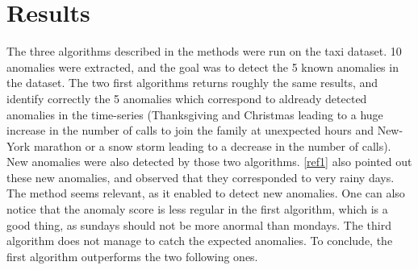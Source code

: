 \documentclass[11pt]{article}
\begin{document}

\section{Results}
The three algorithms described in the methods were run on the taxi dataset. 
10 anomalies were extracted, and the goal was to detect the 5 known anomalies in the dataset. 
The two first algorithms returns roughly the same results, and identify correctly the 5 anomalies which correspond to aldready detected anomalies in the time-series (Thanksgiving and Christmas leading to a huge increase in the number of calls to join the family at unexpected hours and New-York marathon or a snow storm leading to a decrease in the number of calls). 
New anomalies were also detected by those two algorithms.
\ref{ref1} also pointed out these new anomalies, and observed that they corresponded to very rainy days. 
The method seems relevant, as it enabled to detect new anomalies. 
One can also notice that the anomaly score is less regular in the first algorithm, which is a good thing, as sundays should not be more anormal than mondays. 
The third algorithm does not manage to catch the expected anomalies. 
To conclude, the first algorithm outperforms the two following ones. 
\end{document}
